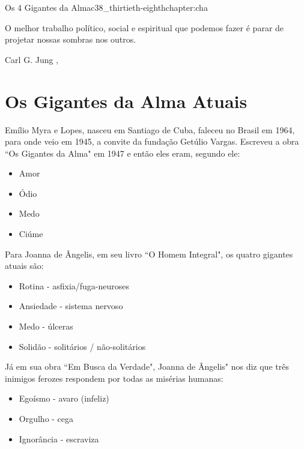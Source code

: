 \begin{chapterpage}{Os 4 Gigantes da Alma}{c38_thirtieth-eighthchapter:cha}
 
\begin{myquotation}O melhor trabalho político, social e espiritual que podemos fazer é parar de projetar nossas sombras nos outros.
\par\vspace*{15mm}
\mbox{}\hfill \emdash{}Carl G. Jung
, %
\par\end{myquotation}

\end{chapterpage}



\section{Os Gigantes da Alma Atuais}\label{c1_basicformatting:sec}

\emdash{}Emílio Myra e Lopes, nasceu em Santiago de Cuba, faleceu no Brasil em 1964, para onde veio em 1945, a convite da fundação Getúlio Vargas. Escreveu a obra ``Os Gigantes da Alma" em 1947 e então eles eram, segundo ele:
\begin{itemize}
    \item Amor
    \item Ódio
    \item Medo
    \item Ciúme
\end{itemize}

\emdash{}Para Joanna de Ângelis, em seu livro ``O Homem Integral", os quatro gigantes atuais são:
\begin{itemize}
    \item Rotina - asfixia/fuga-neuroses
    \item Ansiedade - sistema nervoso
    \item Medo - úlceras
    \item Solidão - solitários / não-solitários
\end{itemize}

\emdash{}Já em sua obra ``Em Busca da Verdade", Joanna de Ângelis" nos diz que três inimigos ferozes respondem por todas as misérias humanas:
\begin{itemize}
    \item Egoísmo - avaro (infeliz)
    \item Orgulho - cega
    \item Ignorância - escraviza
\end{itemize}

